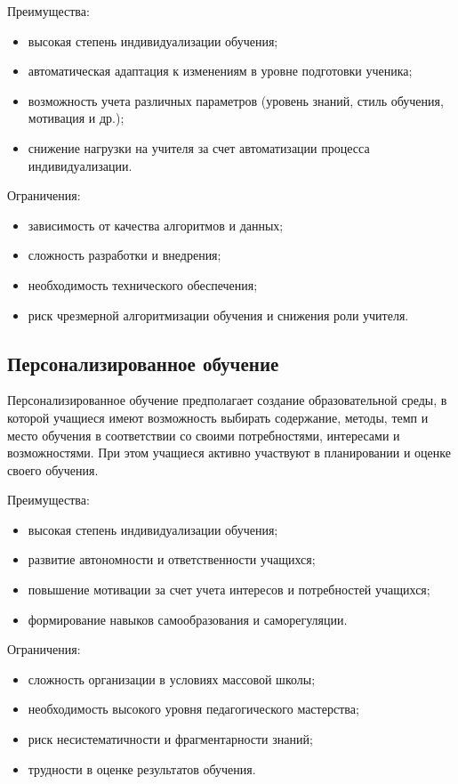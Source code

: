 \documentclass[a4paper,14pt]{extreport}
\begin{document}
Преимущества:
\begin{itemize}
    \item высокая степень индивидуализации обучения;
    \item автоматическая адаптация к изменениям в уровне подготовки ученика;
    \item возможность учета различных параметров (уровень знаний, стиль обучения, мотивация и др.);
    \item снижение нагрузки на учителя за счет автоматизации процесса индивидуализации.
\end{itemize}

Ограничения:
\begin{itemize}
    \item зависимость от качества алгоритмов и данных;
    \item сложность разработки и внедрения;
    \item необходимость технического обеспечения;
    \item риск чрезмерной алгоритмизации обучения и снижения роли учителя.
\end{itemize}

\subsection{Персонализированное обучение}

Персонализированное обучение предполагает создание образовательной среды, в которой учащиеся имеют возможность выбирать содержание, методы, темп и место обучения в соответствии со своими потребностями, интересами и возможностями. При этом учащиеся активно участвуют в планировании и оценке своего обучения.

Преимущества:
\begin{itemize}
    \item высокая степень индивидуализации обучения;
    \item развитие автономности и ответственности учащихся;
    \item повышение мотивации за счет учета интересов и потребностей учащихся;
    \item формирование навыков самообразования и саморегуляции.
\end{itemize}

Ограничения:
\begin{itemize}
    \item сложность организации в условиях массовой школы;
    \item необходимость высокого уровня педагогического мастерства;
    \item риск несистематичности и фрагментарности знаний;
    \item трудности в оценке результатов обучения.
\end{itemize}
\end{document}
